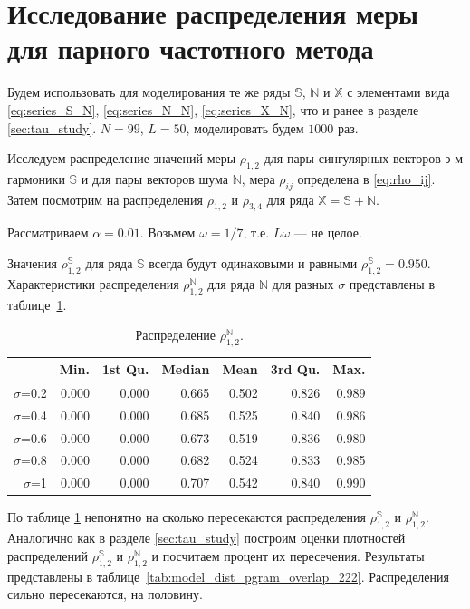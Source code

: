 \documentclass[specialist,
               substylefile = spbu.rtx,
               subf,href,colorlinks=true, 12pt]{disser}
\begin{document}
{{\section{Исследование распределения меры для парного частотного метода}
\label{sec:per_study}

Будем использовать для моделирования те же ряды $\mathbb{S}$, $\mathbb{N}$ и $\mathbb{X}$ с элементами вида
\eqref{eq:series_S_N}, \eqref{eq:series_N_N}, \eqref{eq:series_X_N}, что и ранее в разделе \ref{sec:tau_study}. 
$N = 99$, $L = 50$, моделировать будем $1000$ раз. 

Исследуем распределение значений  меры $\rho_{1,2}$ для пары сингулярных векторов э-м гармоники $\mathbb{S}$ и для пары векторов шума $\mathbb{N}$, мера $\rho_{ij}$ определена в \eqref{eq:rho_ij}. Затем посмотрим на распределения  $\rho_{1,2}$ и  $\rho_{3,4}$ для ряда $\mathbb{X} = \mathbb{S} + \mathbb{N}$.

Рассматриваем $\alpha = 0.01$. Возьмем $\omega = 1/7$, т.е. $L\omega$ --- не целое.

Значения $\rho^{\mathbb{S}}_{1,2}$  для ряда $\mathbb{S}$ всегда будут одинаковыми и равными  $\rho^{\mathbb{S}}_{1,2} = 0.950$. Характеристики распределения $\rho^{\mathbb{N}}_{1,2}$ для ряда $\mathbb{N}$ для разных $\sigma$ представлены в таблице~\ref{tab:model_dist_pgram_sig2}.

\begin{table}[hhh!]
\caption{Распределение $\rho^{\mathbb{N}}_{1,2}$.}
\centering
\begin{tabular}{rrrrrrr}
  \hline
 & Min. & 1st Qu. & Median & Mean & 3rd Qu. & Max. \\ 
  \hline
$\sigma$=0.2 & 0.000 & 0.000 & 0.665 & 0.502 & 0.826 & 0.989 \\ 
  $\sigma$=0.4 & 0.000 & 0.000 & 0.685 & 0.525 & 0.840 & 0.986 \\ 
  $\sigma$=0.6 & 0.000 & 0.000 & 0.673 & 0.519 & 0.836 & 0.980 \\ 
  $\sigma$=0.8 & 0.000 & 0.000 & 0.682 & 0.524 & 0.833 & 0.985 \\ 
  $\sigma$=1 & 0.000 & 0.000 & 0.707 & 0.542 & 0.840 & 0.990 \\ 
   \hline
\end{tabular}
\label{tab:model_dist_pgram_sig2}
\end{table}

По таблице \ref{tab:model_dist_pgram_sig2} непонятно на сколько пересекаются распределения $\rho^{\mathbb{S}}_{1,2}$ и $\rho^{\mathbb{N}}_{1,2}$. 
Аналогично как в разделе \ref{sec:tau_study} построим оценки плотностей распределений $\rho^{\mathbb{S}}_{1,2}$ и  $\rho^{\mathbb{N}}_{1,2}$ и посчитаем процент их пересечения.
Результаты представлены в таблице~\ref{tab:model_dist_pgram_overlap_222}. Распределения сильно пересекаются, на половину.

}}
\end{document}
